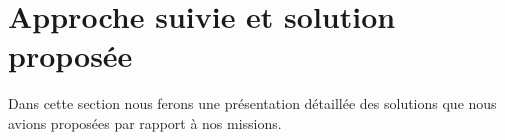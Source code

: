 
\chapter{Approche suivie et solution proposée} %

\label{Chaptre4} %

Dans cette section nous ferons une présentation détaillée des solutions que nous avions proposées par rapport à nos missions.



